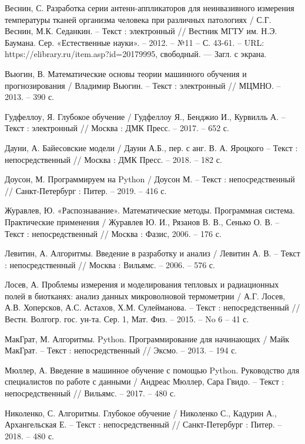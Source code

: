 \begin{thebibliography}{3}
	 Веснин, С. Разработка серии антенн-аппликаторов для неинвазивного измерения температуры тканей организма человека при различных патологиях / С.Г. Веснин, М.К. Седанкин. -- Текст : электронный // Вестник МГТУ им. Н.Э. Баумана. Сер. «Естественные науки». -- 2012. -- №11 -- С. 43-61. -- URL: https://elibrary.ru/item.asp?id=20179995, свободный. — Загл. с экрана.
	
	 Вьюгин, В. Математические основы теории машинного обучения и прогнозирования / Владимир Вьюгин. -- Текст : электронный // МЦМНО. -- 2013. -- 390 с.
	
	 Гудфеллоу, Я.  Глубокое обучение / Гудфеллоу Я., Бенджио И., Курвилль А. -- Текст : электронный // Москва : ДМК Пресс. -- 2017. -- 652 с.				
	
	 Дауни, А. Байесовские модели / Дауни А.Б., пер. с анг. В. А. Яроцкого -- Текст : непосредственный // Москва : ДМК Пресс. -- 2018. -- 182 с.				
	
	 Доусон, М. Программируем на Python / Доусон М. -- Текст : непосредственный // Санкт-Петербург : Питер. -- 2019. -- 416 с.	
	
	 Журавлев, Ю. «Распознавание». Математические методы. Программная система. Практические применения / Журавлев Ю. И., Рязанов В. В., Сенько О. В. -- Текст : непосредственный // Москва : Фазис, 2006. -- 176 с.
	
	 Левитин, А. Алгоритмы. Введение в разработку и анализ / Левитин А. В. -- Текст : непосредственный // Москва : Вильямс. -- 2006. -- 576 с.		
	
	 Лосев, А. Проблемы измерения и моделирования тепловых и радиационных полей в биотканях: анализ данных микроволновой термометрии / А.Г. Лосев, А.В. Хоперсков, А.С. Астахов, Х.М. Сулейманова. -- Текст : непосредственный // Вестн. Волгогр. гос. ун-та. Сер. 1, Мат. Физ. -- 2015. -- No 6 -- 41 с.						
	
	 МакГрат, М. Алгоритмы. Python. Программирование для начинающих / Майк МакГрат. -- Текст : непосредственный // Эксмо. -- 2013. -- 194 с.							
	
	 Мюллер, А. Введение в машинное обучение с помощью Python. Руководство для специалистов по работе с данными / Андреас Мюллер, Сара Гвидо. -- Текст : непосредственный // Вильямс. -- 2017. -- 480 с.				
	
	 Николенко, С. Алгоритмы. Глубокое обучение / Николенко С., Кадурин А., Архангельская Е. -- Текст : непосредственный // Санкт-Петербург : Питер. -- 2018. -- 480 с.
	

\end{thebibliography}
